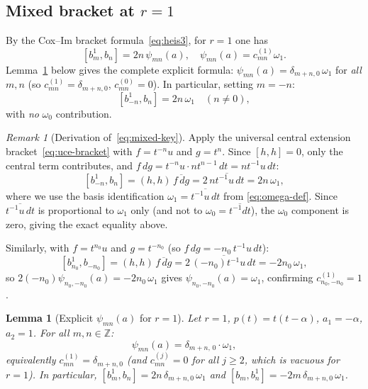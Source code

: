 \documentclass{amsart}
\newcommand{\Z}{\mathbb{Z}}
\newcommand{\ol}{\overline}
\newtheorem{lemma}[theorem]{Lemma}
\theoremstyle{definition}
\theoremstyle{remark}
\newtheorem{remark}[theorem]{Remark}
\numberwithin{equation}{section}
\begin{document}
\subsection{Mixed bracket at $r=1$}
By the Cox--Im bracket formula~\eqref{eq:heis3}, for $r=1$ one has
\begin{equation}\label{eq:psi-r1}
[b_m^1,b_n]=2n\,\psi_{mn}(a),\quad
\psi_{mn}(a)=c_{mn}^{(1)}\omega_1.
\end{equation}
Lemma~\ref{lem:psi-r1-explicit} below gives the complete explicit
formula: $\psi_{mn}(a)=\delta_{m+n,0}\,\omega_1$ for \emph{all} $m,n$
(so $c_{mn}^{(1)}=\delta_{m+n,0}$, $c_{mn}^{(0)}=0$).  In particular,
setting $m=-n$:
\begin{equation}\label{eq:mixed-key}
[b_{-n}^1,b_n]=2n\,\omega_1\quad(n\neq0),
\end{equation}
with \emph{no} $\omega_0$ contribution.
\begin{remark}[Derivation of~\eqref{eq:mixed-key}]\label{rem:mixed-key-proof}
Apply the universal central extension bracket~\eqref{eq:uce-bracket}
with $f=t^{-n}u$ and $g=t^n$.  Since $[h,h]=0$, only the central term
contributes, and $f\,dg = t^{-n}u\cdot nt^{n-1}\,dt = nt^{-1}u\,dt$:
\[
[b_{-n}^1,b_n]
  = (h,h)\,\ol{f\,dg}
  = 2\,\ol{nt^{-1}u\,dt}
  = 2n\,\omega_1,
\]
where we use the basis identification $\omega_1=\ol{t^{-1}u\,dt}$ from
\eqref{eq:omega-def}.  Since $\ol{t^{-1}u\,dt}$ is proportional to
$\omega_1$ only (and not to $\omega_0=\ol{t^{-1}dt}$), the $\omega_0$
component is zero, giving the exact equality above.

Similarly, with $f=t^{n_0}u$ and $g=t^{-n_0}$ (so
$f\,dg = -n_0\,t^{-1}u\,dt$):
\[
[b_{n_0}^1,b_{-n_0}]
  = (h,h)\,\ol{f\,dg}
  = 2\,\ol{(-n_0)t^{-1}u\,dt}
  = -2n_0\,\omega_1,
\]
so $2(-n_0)\psi_{n_0,-n_0}(a)=-2n_0\,\omega_1$ gives
$\psi_{n_0,-n_0}(a)=\omega_1$, confirming $c_{n_0,-n_0}^{(1)}=1$.
\end{remark}
\begin{lemma}[Explicit $\psi_{mn}(a)$ for $r=1$]\label{lem:psi-r1-explicit}
Let $r=1$, $p(t)=t(t-\alpha)$, $a_1=-\alpha$, $a_2=1$.  For all
$m,n\in\Z$:
\begin{equation}\label{eq:psi-explicit-r1}
\psi_{mn}(a) = \delta_{m+n,\,0}\cdot\omega_1,
\end{equation}
equivalently $c_{mn}^{(1)}=\delta_{m+n,0}$ (and $c_{mn}^{(j)}=0$ for
all $j\ge2$, which is vacuous for $r=1$).
In particular, $[b_m^1,b_n]=2n\,\delta_{m+n,0}\,\omega_1$ and
$[b_m,b_n^1]=-2m\,\delta_{m+n,0}\,\omega_1$.
\end{lemma}
\end{document}
